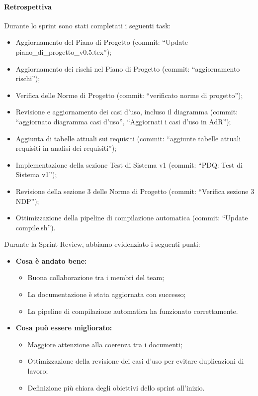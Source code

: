 \documentclass{article}
\begin{document}
                \paragraph{Retrospettiva}
                Durante lo sprint sono stati completati i seguenti task:
                \begin{itemize}
                    \item Aggiornamento del Piano di Progetto (commit: ``Update piano\_di\_progetto\_v0.5.tex'');
                    \item Aggiornamento dei rischi nel Piano di Progetto (commit: ``aggiornamento rischi'');
                    \item Verifica delle Norme di Progetto (commit: ``verificato norme di progetto'');
                    \item Revisione e aggiornamento dei casi d'uso, incluso il diagramma (commit: ``aggiornato diagramma casi d'uso'', ``Aggiornati i casi d'uso in AdR'');
                    \item Aggiunta di tabelle attuali sui requisiti (commit: ``aggiunte tabelle attuali requisiti in analisi dei requisiti'');
                    \item Implementazione della sezione Test di Sistema v1 (commit: ``PDQ: Test di Sistema v1'');
                    \item Revisione della sezione 3 delle Norme di Progetto (commit: ``Verifica sezione 3 NDP'');
                    \item Ottimizzazione della pipeline di compilazione automatica (commit: ``Update compile.sh'').
                \end{itemize}
                
                Durante la Sprint Review, abbiamo evidenziato i seguenti punti:
                \begin{itemize}
                    \item \textbf{Cosa è andato bene:} 
                    \begin{itemize}
                        \item Buona collaborazione tra i membri del team;
                        \item La documentazione è stata aggiornata con successo;
                        \item La pipeline di compilazione automatica ha funzionato correttamente.
                    \end{itemize}
                    \item \textbf{Cosa può essere migliorato:}
                    \begin{itemize}
                        \item Maggiore attenzione alla coerenza tra i documenti;
                        \item Ottimizzazione della revisione dei casi d'uso per evitare duplicazioni di lavoro;
                        \item Definizione più chiara degli obiettivi dello sprint all'inizio.
                    \end{itemize}
                \end{itemize}
\end{document}
